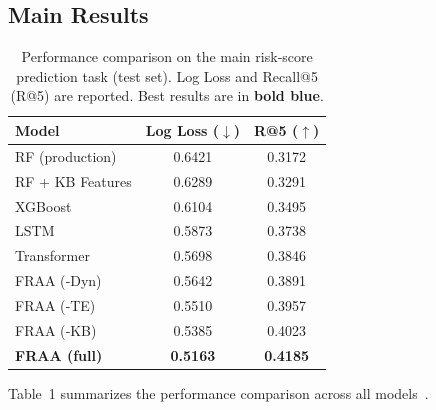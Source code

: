 \documentclass[10pt,twocolumn]{article}
\begin{document}
\subsection{Main Results}

\begin{table}[t!]
\centering
\caption{Performance comparison on the main risk‑score prediction task (test set). Log Loss and Recall@5 (R@5) are reported. Best results are in \textcolor{bestresult}{\textbf{bold blue}}.\footnotemark[1]}
\begin{tabular}{lcc}
\toprule
\rowcolor{tablerowalt}
\textbf{Model} & \textbf{Log Loss (\(\downarrow\))} & \textbf{R@5 (\(\uparrow\))} \\
\midrule
RF (production)          & 0.6421          & 0.3172 \\
\rowcolor{tablerowalt}
RF + KB Features         & 0.6289          & 0.3291 \\
XGBoost                  & 0.6104          & 0.3495 \\
\rowcolor{tablerowalt}
LSTM                     & 0.5873          & 0.3738 \\
Transformer              & 0.5698          & 0.3846 \\
\rowcolor{tablerowalt}
FRAA (‑Dyn)              & 0.5642          & 0.3891 \\
FRAA (‑TE)               & 0.5510          & 0.3957 \\
\rowcolor{tablerowalt}
FRAA (‑KB)               & 0.5385          & 0.4023 \\
\midrule
\textbf{FRAA (full)}     & \textcolor{bestresult}{\textbf{0.5163}} & \textcolor{bestresult}{\textbf{0.4185}} \\
\bottomrule
\end{tabular}
\end{table}

Table~1 summarizes the performance comparison across all models~\cite{arxiv-2512.14990,arxiv-2511.15435}.
\end{document}
